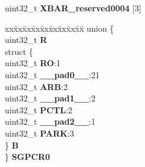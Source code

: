 \begin{DoxyCompactItemize}
\begin{tabbing}
\end{tabbing}\item 
\mbox{\label{structXBAR__tag_a91156419feeb1c57851df21614919c65}} 
uint32\+\_\+t {\bfseries X\+B\+A\+R\+\_\+reserved0004} \mbox{[}3\mbox{]}
\item 
\mbox{\label{structXBAR__tag_a955d083f74222a76f2b9a87477efc26f}} 
\begin{tabbing}
xx\=xx\=xx\=xx\=xx\=xx\=xx\=xx\=xx\=\kill
union \{\\
\>uint32\_t {\bfseries R}\\
\>struct \{\\
\>\>uint32\_t {\bfseries RO}:1\\
\>\>uint32\_t {\bfseries \_\_pad0\_\_}:21\\
\>\>uint32\_t {\bfseries ARB}:2\\
\>\>uint32\_t {\bfseries \_\_pad1\_\_}:2\\
\>\>uint32\_t {\bfseries PCTL}:2\\
\>\>uint32\_t {\bfseries \_\_pad2\_\_}:1\\
\>\>uint32\_t {\bfseries PARK}:3\\
\>\} {\bfseries B}\\
\} {\bfseries SGPCR0}\\


\end{tabbing}
\end{DoxyCompactItemize}
